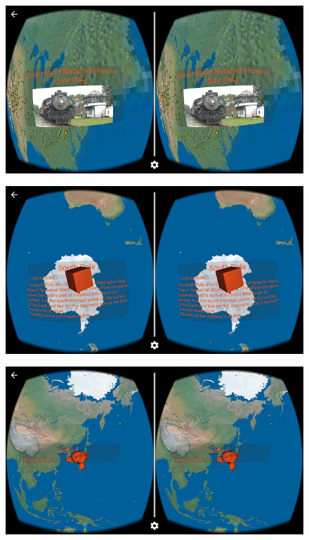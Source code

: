 \begin{figure}[H]
	\centering
	\includegraphics[width=\textwidth, keepaspectratio]{Figures/Screenshots/placemark-image.png}
	\decoRule
\end{figure}

\begin{figure}[H]
	\centering
	\includegraphics[width=\textwidth, keepaspectratio]{Figures/Screenshots/placemark-obj-1.png}
	\decoRule
\end{figure}

\begin{figure}[H]
	\centering
	\includegraphics[width=\textwidth, keepaspectratio]{Figures/Screenshots/placemark-obj-2.png}
	\decoRule
\end{figure}

